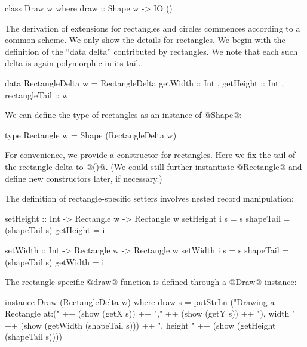 \documentclass{jfp}
\begin{document}
\begin{code}
 class Draw w
  where
   draw :: Shape w -> IO ()
\end{code}

The derivation of extensions for rectangles and circles commences
according to a common scheme. We only show the details for rectangles.
We begin with the definition of the ``data delta'' contributed by
rectangles. We note that each such delta is again polymorphic in its
tail.

\begin{code}
 data RectangleDelta w =
      RectangleDelta { getWidth      :: Int 
                     , getHeight     :: Int
                     , rectangleTail :: w }
\end{code}

We can define the type of rectangles as an instance of @Shape@:

\begin{code}
 type Rectangle w = Shape (RectangleDelta w)
\end{code}

For convenience, we provide a constructor for rectangles. Here we fix
the tail of the rectangle delta to @()@. (We could still further
instantiate @Rectangle@ and define new constructors later, if
necessary.)



The definition of rectangle-specific setters involves nested record
manipulation:

\begin{code}
 setHeight :: Int -> Rectangle w -> Rectangle w
 setHeight i s = s { shapeTail = (shapeTail s) { getHeight = i } }
\end{code}

\begin{code}
 setWidth :: Int -> Rectangle w -> Rectangle w
 setWidth i s = s { shapeTail = (shapeTail s) { getWidth = i } }
\end{code}

The rectangle-specific @draw@ function is defined through a @Draw@ instance:

\begin{code}
 instance Draw (RectangleDelta w)
  where
   draw s
     =   putStrLn ("Drawing a Rectangle at:("
     ++ (show (getX s))
     ++ ","
     ++ (show (getY s))
     ++ "), width "
     ++ (show (getWidth (shapeTail s)))
     ++ ", height "
     ++ (show (getHeight (shapeTail s))))
\end{code}
\end{document}
